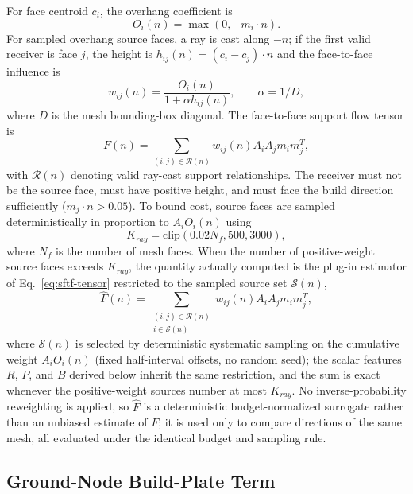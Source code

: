 \documentclass[11pt,a4paper]{article}
\begin{document}
For face centroid $c_i$, the overhang coefficient is
\begin{equation}
O_i(n)=\max(0,-m_i\cdot n).
\end{equation}
For sampled overhang source faces, a ray is cast along $-n$; if the first valid receiver is face $j$, the height is $h_{ij}(n)=(c_i-c_j)\cdot n$ and the face-to-face influence is
\begin{equation}
w_{ij}(n)=\frac{O_i(n)}{1+\alpha h_{ij}(n)}, \qquad \alpha=1/D,
\end{equation}
where $D$ is the mesh bounding-box diagonal. The face-to-face support flow tensor is
\begin{equation}
F(n)=\sum_{(i,j)\in\mathcal{R}(n)} w_{ij}(n)A_iA_jm_im_j^T,
\label{eq:sftf-tensor}
\end{equation}
with $\mathcal{R}(n)$ denoting valid ray-cast support relationships. The receiver must not be the source face, must have positive height, and must face the build direction sufficiently ($m_j\cdot n>0.05$). To bound cost, source faces are sampled deterministically in proportion to $A_iO_i(n)$ using
\begin{equation}
K_{ray}=\mathrm{clip}(0.02N_f,500,3000),
\label{eq:kray-budget}
\end{equation}
where $N_f$ is the number of mesh faces. When the number of positive-weight source faces exceeds $K_{ray}$, the quantity actually computed is the plug-in estimator of Eq.~\eqref{eq:sftf-tensor} restricted to the sampled source set $\mathcal{S}(n)$,
\begin{equation}
\hat F(n)=\sum_{\substack{(i,j)\in\mathcal{R}(n)\\ i\in\mathcal{S}(n)}} w_{ij}(n)A_iA_jm_im_j^T,
\label{eq:sftf-tensor-estimator}
\end{equation}
where $\mathcal{S}(n)$ is selected by deterministic systematic sampling on the cumulative weight $A_iO_i(n)$ (fixed half-interval offsets, no random seed); the scalar features $R$, $P$, and $B$ derived below inherit the same restriction, and the sum is exact whenever the positive-weight sources number at most $K_{ray}$. No inverse-probability reweighting is applied, so $\hat F$ is a deterministic budget-normalized surrogate rather than an unbiased estimate of $F$; it is used only to compare directions of the same mesh, all evaluated under the identical budget and sampling rule.

\subsection{Ground-Node Build-Plate Term}
\label{sec:groundnode}
\end{document}
